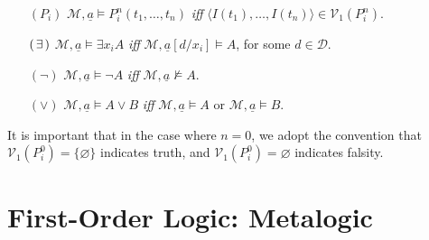\documentclass[a4paper, 11pt]{article} %
\newcommand{\tuple}[1]{\langle#1\rangle} %
\newcommand{\set}[1]{\lbrace#1\rbrace} %
\begin{document}
\begin{enumerate}[leftmargin=1.2in,labelsep=.15in]
\begin{small}
\begin{itemize}[leftmargin=.36in]
\item[$(P_i)$] $\mathcal{M},\underline{a}\vDash  P_i^n(t_1,\dots,t_n)$ \textit{iff} $\tuple{I(t_1),\dots,I(t_n)}\in \mathcal{V}_1(P_i^n)$.
\item[$(\hspace{1.5pt}\exists\hspace{1.5pt})$] $\mathcal{M},\underline{a}\vDash  \exists x_iA$ \textit{iff} $\mathcal{M},\underline{a}[d/x_i]\vDash A$, for some $d\in\mathcal{D}$.
\item[$(\neg)$] $\mathcal{M},\underline{a}\vDash  \neg A$ \textit{iff} $\mathcal{M},\underline{a}\nvDash A$.
\item[$(\vee)$] $\mathcal{M},\underline{a}\vDash  A\vee B$ \textit{iff} $\mathcal{M},\underline{a}\vDash  A$ or $\mathcal{M},\underline{a}\vDash  B$.
\end{itemize}
\end{small}
It is important that in the case where $n=0$, we adopt the convention that $\mathcal{V}_1(P_i^0)=\set{\varnothing}$ indicates truth, and $\mathcal{V}_1(P_i^0)=\varnothing$ indicates falsity.
\end{enumerate}



\section*{\sc First-Order Logic: Metalogic}%
\end{document}
